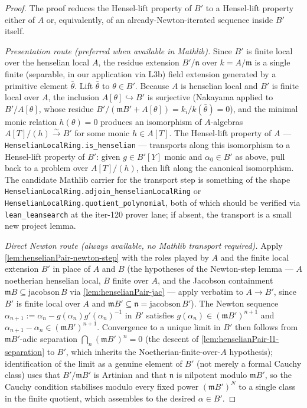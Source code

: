 \begin{proof}
\leanok
The proof reduces the Hensel-lift property of $B'$ to a
Hensel-lift property either of $A$ or, equivalently, of an
already-Newton-iterated sequence inside $B'$ itself.

\emph{Presentation route (preferred when available in Mathlib).}
Since $B'$ is finite local over the henselian local $A$, the
residue extension $B'/\mathfrak n$ over $k = A/\mathfrak m$ is a
single finite (separable, in our application via L3b) field
extension generated by a primitive element $\bar\theta$. Lift
$\bar\theta$ to $\theta \in B'$. Because $A$ is henselian local
and $B'$ is finite local over $A$, the inclusion $A[\theta]
\hookrightarrow B'$ is surjective (Nakayama applied to
$B'/A[\theta]$, whose residue $B'/(\mathfrak m B' + A[\theta]) =
k_i / k(\bar\theta) = 0$), and the minimal monic relation
$h(\theta) = 0$ produces an isomorphism of $A$-algebras
$A[T]/(h) \xrightarrow{\sim} B'$ for some monic $h \in A[T]$. The
Hensel-lift property of $A$ —
\texttt{HenselianLocalRing.is\_henselian} — transports along this
isomorphism to a Hensel-lift property of $B'$: given $g \in B'[Y]$
monic and $\alpha_0 \in B'$ as above, pull back to a problem over
$A[T]/(h)$, then lift along the canonical isomorphism. The
candidate Mathlib carrier for the transport step is something of
the shape
\texttt{HenselianLocalRing.adjoin\_henselianLocalRing} or
\texttt{HenselianLocalRing.quotient\_polynomial}, both of which
should be verified via \texttt{lean\_leansearch} at the
iter-120 prover lane; if absent, the transport is a small new
project lemma.

\emph{Direct Newton route (always available, no Mathlib transport
required).} Apply \cref{lem:henselianPair-newton-step} with the
roles played by $A$ and the finite local extension $B'$ in place
of $A$ and $B$ (the hypotheses of the Newton-step lemma — $A$
noetherian henselian local, $B$ finite over $A$, and the
Jacobson containment $\mathfrak m B \subseteq
\mathrm{jacobson}\,B$ via \cref{lem:henselianPair-jac} — apply
verbatim to $A \to B'$, since $B'$ is finite local over $A$ and
$\mathfrak m B' \subseteq \mathfrak n = \mathrm{jacobson}\,B'$).
The Newton sequence $\alpha_{n+1} := \alpha_n - g(\alpha_n)
g'(\alpha_n)^{-1}$ in $B'$ satisfies $g(\alpha_n) \in (\mathfrak
m B')^{n+1}$ and $\alpha_{n+1} - \alpha_n \in (\mathfrak m
B')^{n+1}$. Convergence to a unique limit in $B'$ then follows
from $\mathfrak m B'$-adic separation
$\bigcap_n (\mathfrak m B')^n = 0$ (the descent of
\cref{lem:henselianPair-l1-separation} to $B'$, which inherits
the Noetherian-finite-over-$A$ hypothesis); identification of the
limit as a genuine element of $B'$ (not merely a formal Cauchy
class) uses that $B'/\mathfrak m B'$ is Artinian and that
$\mathfrak n$ is nilpotent modulo $\mathfrak m B'$, so the
Cauchy condition stabilises modulo every fixed power
$(\mathfrak m B')^N$ to a single class in the finite quotient,
which assembles to the desired $\alpha \in B'$.


\end{proof}

